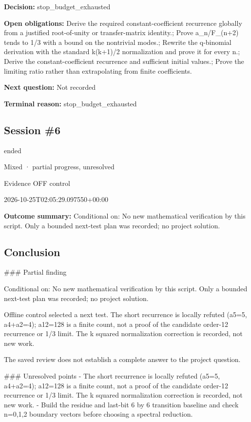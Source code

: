 \documentclass[11pt]{article}
\begin{document}
\textbf{Decision:} stop\_budget\_exhausted\par
\textbf{Open obligations:} Derive the required constant-coefficient recurrence globally from a justified root-of-unity or transfer-matrix identity.; Prove a\_n/F\_(n+2) tends to 1/3 with a bound on the nontrivial modes.; Rewrite the q-binomial derivation with the standard k(k+1)/2 normalization and prove it for every n.; Derive the constant-coefficient recurrence and sufficient initial values.; Prove the limiting ratio rather than extrapolating from finite coefficients.\par
\textbf{Next question:} Not recorded\par
\textbf{Terminal reason:} stop\_budget\_exhausted\par
\subsection{Session \#6}
\begin{description}[style=nextline,font=\normalfont\bfseries,leftmargin=0pt,labelsep=0pt]
\item[Execution status] ended
\item[Outcome] Mixed · partial progress, unresolved
\item[Strategy] Evidence OFF control
\item[Started] 2026-10-25T02:05:29.097550+00:00
\end{description}
\textbf{Outcome summary:} Conditional on: No new mathematical verification by this script. Only a bounded next-test plan was recorded; no project solution.\par
\subsection{Conclusion}
\#\#\# Partial finding

Conditional on: No new mathematical verification by this script. Only a bounded next-test plan was recorded; no project solution.

Offline control selected a next test. The short recurrence is locally refuted (a5=5, a4+a2=4); a12=128 is a finite count, not a proof of the candidate order-12 recurrence or 1/3 limit. The k squared normalization correction is recorded, not new work.

The saved review does not establish a complete answer to the project question.

\#\#\# Unresolved points
- The short recurrence is locally refuted (a5=5, a4+a2=4); a12=128 is a finite count, not a proof of the candidate order-12 recurrence or 1/3 limit. The k squared normalization correction is recorded, not new work.
- Build the residue and last-bit 6 by 6 transition baseline and check n=0,1,2 boundary vectors before choosing a spectral reduction.
\end{document}
